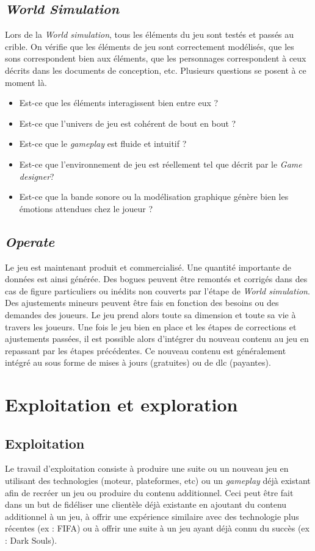 \subsection{\emph{World Simulation}}
Lors de la \emph{World simulation}, tous les éléments du jeu sont testés et passés au crible. On vérifie que les éléments de jeu sont correctement modélisés, que les sons correspondent bien aux éléments, que les personnages correspondent à ceux décrits dans les documents de conception, etc. Plusieurs questions se posent à ce moment là. 
\begin{itemize}
    \item Est-ce que les éléments interagissent bien entre eux ?
    \item Est-ce que l'univers de jeu est cohérent de bout en bout ?
    \item Est-ce que le \emph{gameplay} est fluide et intuitif ?
    \item Est-ce que l'environnement de jeu est réellement tel que décrit par le \emph{Game designer}?
    \item Est-ce que la bande sonore ou la modélisation graphique génère bien les émotions attendues chez le joueur ?
\end{itemize}


\subsection{\emph{Operate}}
Le jeu est maintenant produit et commercialisé. Une quantité importante de données est ainsi générée. Des bogues peuvent être remontés et corrigés dans des cas de figure particuliers ou inédits non couverts par l'étape de \emph{World simulation}. Des ajustements mineurs peuvent être fais en fonction des besoins ou des demandes des joueurs. Le jeu prend alors toute sa dimension et toute sa vie à travers les joueurs.
Une fois le jeu bien en place et les étapes de corrections et ajustements passées, il est possible alors d'intégrer du nouveau contenu au jeu en repassant par les étapes précédentes. Ce nouveau contenu est généralement intégré au sous forme de mises à jours (gratuites) ou de \gls{dlc} (payantes).



\section{Exploitation et exploration}
\subsection{Exploitation}
Le travail d'exploitation consiste à produire une suite ou un nouveau jeu en utilisant des technologies (moteur, plateformes, etc) ou un \emph{gameplay} déjà existant afin de recréer un jeu ou produire du contenu additionnel. Ceci peut être fait dans un but de fidéliser une clientèle déjà existante en ajoutant du contenu additionnel à un jeu, à offrir une expérience similaire avec des technologie plus récentes (ex : FIFA) ou à offrir une suite à un jeu ayant déjà connu du succès (ex : Dark Souls).

